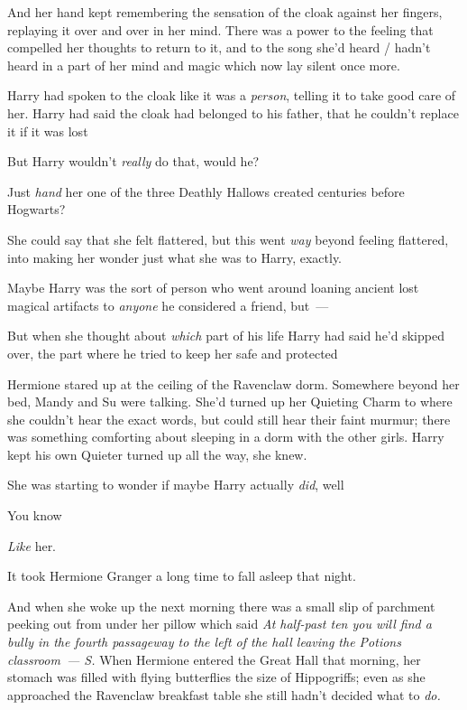 And her hand kept remembering the sensation of the cloak against her fingers,
replaying it over and over in her mind. There was a power to the feeling that
compelled her thoughts to return to it, and to the song she'd heard / hadn't
heard in a part of her mind and magic which now lay silent once more.

Harry had spoken to the cloak like it was a \emph{person}, telling it to take
good care of her. Harry had said the cloak had belonged to his father, that he
couldn't replace it if it was lost{\el}

But{\el} Harry wouldn't \emph{really} do that, would he?

Just \emph{hand} her one of the three Deathly Hallows created centuries before
Hogwarts?

She could say that she felt flattered, but this went \emph{way} beyond feeling
flattered, into making her wonder just what she was to Harry, exactly.

Maybe Harry was the sort of person who went around loaning ancient lost magical
artifacts to \emph{anyone} he considered a friend, but~---

But when she thought about \emph{which} part of his life Harry had said he'd
skipped over, the part where he tried to keep her safe and protected{\el}

Hermione stared up at the ceiling of the Ravenclaw dorm. Somewhere beyond her
bed, Mandy and Su were talking. She'd turned up her Quieting Charm to where she
couldn't hear the exact words, but could still hear their faint murmur; there
was something comforting about sleeping in a dorm with the other girls. Harry
kept his own Quieter turned up all the way, she knew.

She was starting to wonder if maybe Harry actually \emph{did}, well{\el}

You know{\el}

\emph{Like} her.

It took Hermione Granger a long time to fall asleep that night.

And when she woke up the next morning there was a small slip of parchment
peeking out from under her pillow which said \emph{At half-past ten you will
find a bully in the fourth passageway to the left of the hall leaving the
Potions classroom~--- S.}
\sbreak
When Hermione entered the Great Hall that morning, her stomach was filled with
flying butterflies the size of Hippogriffs; even as she approached the
Ravenclaw breakfast table she still hadn't decided what to \emph{do.}

